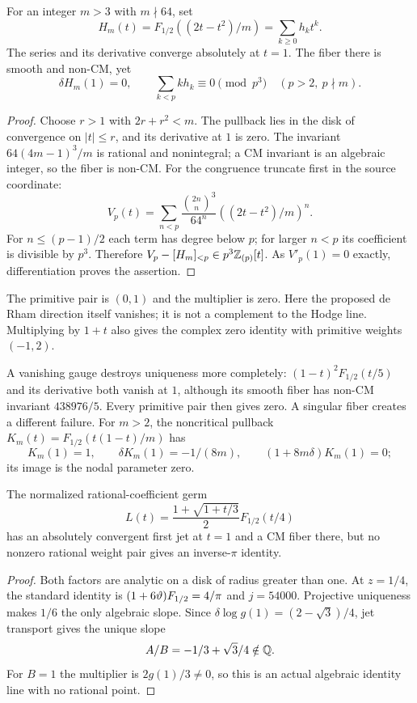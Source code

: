\begin{proposition}
\label{prop:critical-countermodels}
For an integer $m>3$ with $m\nmid64$, set
\[
 H_m(t)=F_{1/2}((2t-t^2)/m)=\sum_{k\ge0}h_kt^k.
\]
The series and its derivative converge absolutely at $t=1$.
The fiber there is smooth and non-CM, yet
\[
 \delta H_m(1)=0,\qquad
 \sum_{k<p}kh_k\equiv0\pmod{p^3}\quad(p>2,\ p\nmid m).
\]
\end{proposition}
\begin{proof}
Choose $r>1$ with $2r+r^2<m$. The pullback lies in the disk of
convergence on $|t|\le r$, and its derivative at $1$ is zero.
The invariant $64(4m-1)^3/m$ is rational and nonintegral; a CM
invariant is an algebraic integer, so the fiber is non-CM.
For the congruence truncate first in the source coordinate:
\[
 V_p(t)=\sum_{n<p}\frac{\binom{2n}{n}^3}{64^n}
                       ((2t-t^2)/m)^n.
\]
For $n\le(p-1)/2$ each term has degree below $p$; for larger
$n<p$ its coefficient is divisible by $p^3$. Therefore
$V_p-[H_m]_{<p}\in p^3\mathbb Z_{(p)}[t]$. As $V'_p(1)=0$ exactly,
differentiation proves the assertion.
\end{proof}
The primitive pair is $(0,1)$ and the multiplier is zero. Here the
proposed de Rham direction itself vanishes; it is not a complement
to the Hodge line. Multiplying by $1+t$ also gives the complex zero
identity with primitive weights $(-1,2)$.

A vanishing gauge destroys uniqueness more completely:
$(1-t)^2F_{1/2}(t/5)$ and its derivative both vanish at $1$,
although its smooth fiber has non-CM invariant $438976/5$.
Every primitive pair then gives zero. A singular fiber creates a
different failure. For $m>2$, the noncritical pullback
$K_m(t)=F_{1/2}(t(1-t)/m)$ has
\[
 K_m(1)=1,\qquad\delta K_m(1)=-1/(8m),\qquad
 (1+8m\delta)K_m(1)=0;
\]
its image is the nodal parameter zero.

\begin{proposition}
\label{prop:gauge-rational-slope-countermodel}
The normalized rational-coefficient germ
\[
 L(t)=\frac{1+\sqrt{1+t/3}}2F_{1/2}(t/4)
\]
has an absolutely convergent first jet at $t=1$ and a CM fiber there,
but no nonzero rational weight pair gives an inverse-$\pi$ identity.
\end{proposition}
\begin{proof}
Both factors are analytic on a disk of radius greater than one.
At $z=1/4$, the standard identity is
$(1+6\vartheta)F_{1/2}=4/\pi$ and $j=54000$.
Projective uniqueness makes $1/6$ the only algebraic slope.
Since $\delta\log g(1)=(2-\sqrt3)/4$, jet transport gives the unique
slope
\[
                 A/B=-1/3+\sqrt3/4\notin\mathbb Q.
\]
For $B=1$ the multiplier is $2g(1)/3\ne0$, so this is an actual
algebraic identity line with no rational point.
\end{proof}

